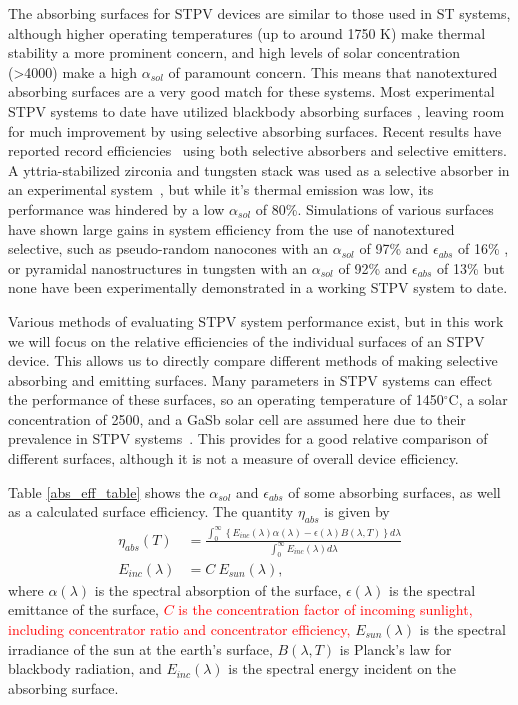 \documentclass[review]{elsarticle}
\begin{document}
The absorbing surfaces for STPV devices are similar to those used in ST systems, although higher operating temperatures (up to around 1750 K) 
make thermal stability a more prominent concern, and high levels of solar concentration (\textgreater4000) make a high $\alpha_{sol}$ of 
paramount concern.  This means that nanotextured absorbing surfaces are a very good match for these systems.  Most experimental STPV systems 
to date have utilized blackbody absorbing surfaces \cite{exp_tokyo,exp_madrid,exp_russia,MIT_paper}, leaving room for much improvement by using 
selective absorbing surfaces. Recent results have reported record efficiencies~\cite{g11,SKY_JPE_2015} using both 
selective absorbers and selective emitters. A yttria-stabilized zirconia and tungsten stack was used as a selective absorber in an experimental system~\cite{SKY_JPE_2015}, 
but while it's thermal emission was low, its performance was hindered by a low $\alpha_{sol}$ of 80\%.  Simulations of various surfaces 
have shown large gains in system efficiency from the use of nanotextured selective, such as pseudo-random 
nanocones with an $\alpha_{sol}$ of 97\% and $\epsilon_{abs}$ of 16\% \cite{me1}, or pyramidal nanostructures in tungsten 
with an $\alpha_{sol}$ of 92\% and $\epsilon_{abs}$ of 13\% \cite{paper1_ref4} but none have been experimentally 
demonstrated in a working STPV system to date.

Various methods of evaluating STPV system performance exist, but in this work we will focus on the relative efficiencies of the individual surfaces of an STPV device.  This allows us to directly compare different methods of making selective absorbing and emitting surfaces.  Many parameters in STPV systems can effect the performance of these surfaces, so an operating temperature of 1450$^\circ$C, a solar concentration of 2500, and a GaSb solar cell are assumed here due to their prevalence in STPV systems~\cite{exp_tokyo,exp_madrid,exp_russia,me1,me2,RF_OptExp_2009}.  This provides for a good relative comparison of different surfaces, although it is not a measure of overall device efficiency.

Table \ref{abs_eff_table} shows the $\alpha_{sol}$ and $\epsilon_{abs}$ of some absorbing surfaces, as well as a calculated surface efficiency.  The quantity $\eta_{abs}$ is given by
\begin{align}
\label{overall_sss_eq}\eta_{abs}(T)& = \frac{\int_{0}^{\infty}\left\{E_{inc}(\lambda)\alpha(\lambda)-\epsilon(\lambda)B(\lambda,T)\right\}d\lambda}{\int_{0}^{\infty}E_{inc}(\lambda)d\lambda}\\
\label{e_incident}E_{inc}(\lambda) &= C \: E_{sun}(\lambda),
\end{align}
where $\alpha(\lambda)$ is the spectral absorption of the surface, $\epsilon(\lambda)$ is the spectral emittance of the surface, \textcolor{red}{$C$ is the concentration factor of incoming sunlight, including concentrator ratio and concentrator efficiency,} $E_{sun}(\lambda)$ is the 
spectral irradiance of the sun at the earth's surface, $B(\lambda, T)$ is 
Planck's law for blackbody radiation, and $E_{inc}(\lambda)$ is the spectral 
energy incident on the absorbing surface.
\end{document}
